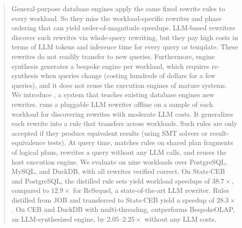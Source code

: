 \begin{abstract}
General-purpose database engines apply the same fixed rewrite rules to every workload.
So they miss the workload-specific rewrites and phase ordering that can yield order-of-magnitude speedups.
LLM-based rewriters discover such rewrites via whole-query rewriting, but they pay high costs in terms of LLM tokens and inference time for every query or template. These rewrites do not readily transfer to new queries. Furthermore, engine synthesis generates a bespoke engine per workload, which requires re-synthesis when queries change (costing hundreds of dollars for a few queries), and it does not reuse the execution engines of mature systems.
We introduce {\sys}, a system that teaches existing database engines new rewrites.
{\sys} runs a pluggable LLM rewriter 
offline on a sample of each workload for discovering rewrites with moderate LLM costs.
It generalizes each rewrite into a rule that transfers across workloads.
Such rules are only accepted if they produce equivalent results (using SMT solvers or result-equivalence tests).
At query time, {\sys} matches rules on shared plan fragments of logical plans, rewrites a query without any LLM calls, and reuses the host execution engine.
We evaluate {\sys} on nine workloads over PostgreSQL, MySQL, and DuckDB, with all rewrites verified correct.
On Stats-CEB and PostgreSQL, the distilled rule sets yield workload speedups of $38.7\times$, compared to $12.9\times$ for ReSequel, a state-of-the-art LLM rewriter.
Rules distilled from JOB and transferred to Stats-CEB yield a speedup of $28.3\times$.
On CEB and DuckDB with multi-threading, {\sys} outperforms BespokeOLAP, an LLM-synthesized engine, by $2.05$--$2.25\times$ without any LLM costs.
\end{abstract}
